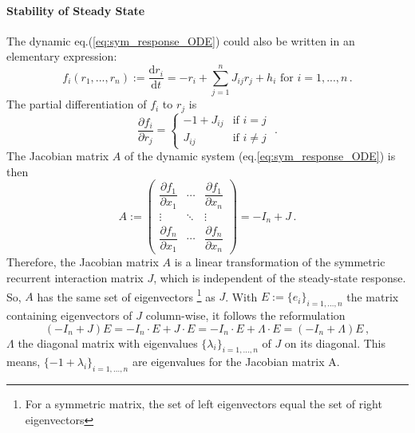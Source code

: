 \documentclass[11pt]{article}
\begin{document}
{	\paragraph{Stability of Steady State}
	The dynamic eq.(\ref{eq:sym_response_ODE}) could also be written in an elementary expression:
		\begin{equation}
			 f_i (r_1, ..., r_n) := \frac{\mathrm{d} r_i}{\mathrm{d} t} = - r_i + \sum_{j=1}^{n} J_{ij} r_j + h_i  \text{   for } i = 1, ..., n\, .
		\end{equation}
	The partial differentiation of $f_i$ to $r_j$ is
		\begin{equation}
			\frac{\partial f_i}{\partial r_j} = 
			\begin{cases}
				-1 + J_{ij} & \text{if} \, \,  i = j \\
				J_{ij} & \text{if} \, \, i \neq j
			\end{cases} \, \, .
		\end{equation}
	The Jacobian matrix $A$ of the dynamic system (eq.\ref{eq:sym_response_ODE}) is then
		\begin{equation} \label{eq:Jacobian_matrix}
			A := 
			 \begin{pmatrix}
				\dfrac{\partial f_1}{\partial x_1} & \cdots & \dfrac{\partial f_1}{\partial x_n}\\
				\vdots                             & \ddots & \vdots\\
				\dfrac{\partial f_n}{\partial x_1} & \cdots & \dfrac{\partial f_n}{\partial x_n}
			\end{pmatrix}
			= - I_n + J \, .
		\end{equation}
	Therefore, the Jacobian matrix $A$ is a linear transformation of the symmetric recurrent interaction matrix $J$, which is independent of the steady-state response. So, $A$ has the same set of eigenvectors \footnote{For a symmetric matrix, the set of left eigenvectors equal the set of right eigenvectors} as $J$. With $E := \{e_i\}_{i = 1, ..., n}$ the matrix containing eigenvectors of $J$ column-wise, it follows the reformulation 
		\begin{equation} \label{eq:steady_state_eigenvalues_sym}
			(- I_n + J) E = - I_n \cdot E + J \cdot E = -I_n \cdot E + \Lambda \cdot E = (-I_n + \Lambda) E \, ,
		\end{equation}
	$\Lambda$ the diagonal matrix with eigenvalues $\{\lambda_i\}_{i = 1,...,n}$ of $J$ on its diagonal. This means, $\{-1 + \lambda_i\}_{i=1, ..., n}$ are eigenvalues for the Jacobian matrix A. 
	
}
\end{document}
